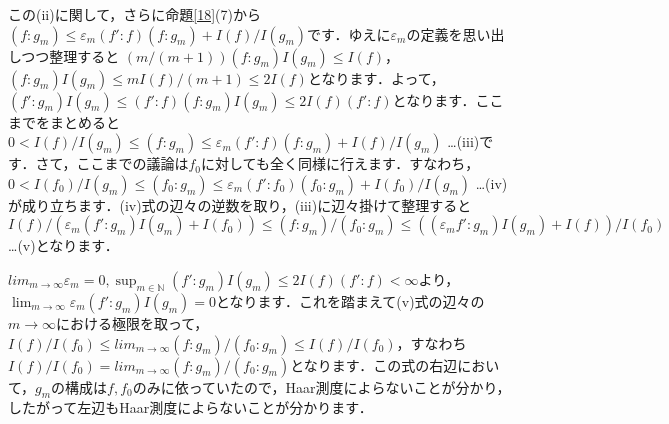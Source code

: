 この(ii)に関して，さらに命題\ref{18}(7)から$\left( f \colon g_{m} \right) \le \varepsilon_{m} \left( f' \colon f \right) \left( f \colon g_{m} \right) + I(f)/I(g_{m})$です．ゆえに$\varepsilon_{m}$の定義を思い出しつつ整理すると $\left( m/(m+1) \right) \left( f \colon g_{m} \right)I(g_{m}) \le I(f)$，$\left( f \colon g_{m} \right)I(g_{m}) \le mI(f)/(m+1) \le 2I(f)$となります．よって，$\left( f' \colon g_{m} \right)I(g_{m}) \le 
\left( f' \colon f \right) \left( f \colon g_{m} \right) I(g_{m}) \le 2I(f)\left( f' \colon f \right)$となります．ここまでをまとめると$0<I(f)/I(g_{m}) \le \left( f \colon g_{m} \right) \le \varepsilon_{m} \left( f' \colon f \right) \left( f \colon g_{m} \right) + I(f)/I(g_{m})$ …(iii)です．さて，ここまでの議論は$f_0$に対しても全く同様に行えます．すなわち，$0<I(f_0)/I(g_{m}) \le \left( f_0 \colon g_{m} \right) \le \varepsilon_{m} \left( f' \colon f_0 \right) \left( f_0 \colon g_{m} \right) + I(f_0)/I(g_{m})$ …(iv)が成り立ちます．(iv)式の辺々の逆数を取り，(iii)に辺々掛けて整理すると$I(f)/ \left( \varepsilon_{m} \left( f' \colon g_{m} \right)I(g_{m}) + I(f_0) \right) \le \left( f \colon g_{m} \right) / \left( f_0 \colon g_{m} \right) \le \left( \left( \varepsilon_{m} f' \colon g_{m} \right)I(g_{m}) + I(f) \right) / I(f_0)$…(v)となります．

$lim_{m \to \infty}\varepsilon_{m} =0, \sup_{m \in \mathbb{N}}\left( f' \colon g_{m} \right)I(g_{m}) \le 2I(f)\left( f' \colon f \right) < \infty$より，$\lim_{m \to \infty}\varepsilon_{m} \left( f' \colon g_{m} \right)I(g_{m})=0$となります．これを踏まえて(v)式の辺々の$m \to \infty$における極限を取って，$I(f)/I(f_{0}) \le lim_{m \to \infty} \left( f \colon g_{m} \right) / \left( f_{0} \colon g_{m} \right) \le I(f)/I(f_{0})$，すなわち $I(f)/I(f_{0})=lim_{m \to \infty} \left( f \colon g_{m} \right) / \left( f_{0} \colon g_{m} \right)$となります．この式の右辺において，$g_{m}$の構成は$f, f_{0}$のみに依っていたので，Haar測度によらないことが分かり，したがって左辺もHaar測度によらないことが分かります．　
\proofend